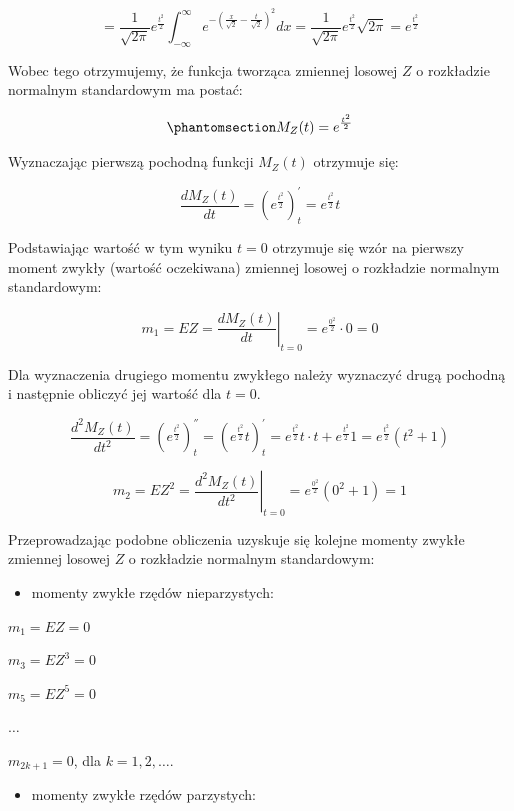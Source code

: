 \documentclass[
  letterpaper,
  DIV=11,
  numbers=noendperiod]{scrreprt}
\providecommand{\tightlist}{%
  \setlength{\itemsep}{0pt}\setlength{\parskip}{0pt}}\usepackage{longtable,booktabs,array}
\begin{document}
\[=\frac{1}{\sqrt{2\pi}} e^{\frac{t^2}{2}} \int_{-\infty}^{\infty} e^{-(\frac{x}{\sqrt{2}}-\frac{t}{\sqrt{2}})^2 } dx=\frac{1}{\sqrt{2\pi}} e^{\frac{t^2}{2}} \sqrt{2\pi}= e^\frac{t^2}{2} \]

Wobec tego otrzymujemy, że funkcja tworząca zmiennej losowej \(Z\) o
rozkładzie normalnym standardowym ma postać:

\begin{equation}\phantomsection\label{eq-fun_tw_nor_s}{M_Z(t) = e^\frac{t^2}{2}}\end{equation}

Wyznaczając pierwszą pochodną funkcji \(M_Z(t)\) otrzymuje się:

\[ \frac{dM_Z(t)}{dt} = (e^\frac{t^2}{2})_t^{'}=e^\frac{t^2}{2}t\]

Podstawiając wartość w tym wyniku \(t = 0\) otrzymuje się wzór na
pierwszy moment zwykły (wartość oczekiwana) zmiennej losowej o
rozkładzie normalnym standardowym:

\[
m_1 = EZ = \left.\frac{dM_Z(t)}{dt}\right|_{t=0} = e^{\frac{0^2}{2}} \cdot 0 = 0
\]

Dla wyznaczenia drugiego momentu zwykłego należy wyznaczyć drugą
pochodną i następnie obliczyć jej wartość dla \(t = 0\).

\[ \frac{d^2M_Z(t)}{dt^2} = \left( e^\frac{t^2}{2} \right)_t^{''}= \left( e^\frac{t^2}{2}t \right) _t^{'}=e^\frac{t^2}{2}t\cdot t+e^\frac{t^2}{2}1 = e^\frac{t^2}{2} (t^2+1)\]

\[
m_2 = EZ^2 = \left.\frac{d^2 M_Z(t)}{dt^2}\right|_{t=0} = e^{\frac{0^2}{2}} (0^2 + 1) = 1
\]

Przeprowadzając podobne obliczenia uzyskuje się kolejne momenty zwykłe
zmiennej losowej \(Z\) o rozkładzie normalnym standardowym:

\begin{itemize}
\tightlist
\item
  momenty zwykłe rzędów nieparzystych:
\end{itemize}

\(m_1 = EZ=0\)

\(m_3 = EZ^3=0\)

\(m_5 = EZ^5=0\)

\(\ldots\)

\(m_{2k+1} = 0\), dla \(k = 1, 2, \ldots\).

\begin{itemize}
\tightlist
\item
  momenty zwykłe rzędów parzystych:
\end{itemize}
\end{document}
